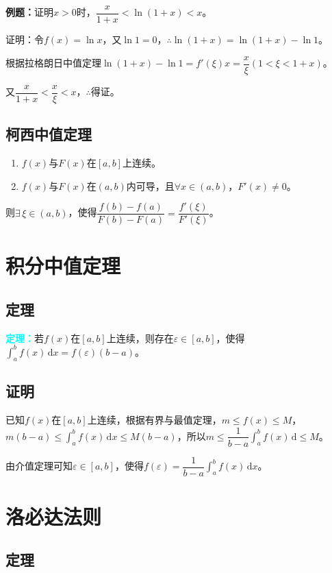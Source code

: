 \documentclass[UTF8, 12pt]{ctexart}
\begin{document}
\textbf{例题：}证明$x>0$时，$\dfrac{x}{1+x}<\ln(1+x)<x$。

证明：令$f(x)=\ln x$，又$\ln 1=0$，$\therefore\ln(1+x)=\ln(1+x)-\ln 1$。

根据拉格朗日中值定理$\ln(1+x)-\ln 1=f'(\xi)x=\dfrac{x}{\xi}(1<\xi<1+x)$。

又$\dfrac{x}{1+x}<\dfrac{x}{\xi}<x$，$\therefore$得证。

\subsection{柯西中值定理}

\begin{enumerate}
    \item $f(x)$与$F(x)$在$[a,b]$上连续。
    \item $f(x)$与$F(x)$在$(a,b)$内可导，且$\forall x\in(a,b)$，$F'(x)\neq 0$。
\end{enumerate}

则$\exists\,\xi\in(a,b)$，使得$\dfrac{f(b)-f(a)}{F(b)-F(a)}=\dfrac{f'(\xi)}{F'(\xi)}$。

\section{积分中值定理}

\subsection{定理}

\textcolor{aqua}{\textbf{定理：}}若$f(x)$在$[a,b]$上连续，则存在$\varepsilon\in[a,b]$，使得$\int_a^bf(x)\,\textrm{d}x=f(\varepsilon)(b-a)$。

\subsection{证明}

已知$f(x)$在$[a,b]$上连续，根据有界与最值定理，$m\leqslant f(x)\leqslant M$，$m(b-a)\leqslant\int_a^bf(x)\,\textrm{d}x\leqslant M(b-a)$，所以$m\leqslant\dfrac{1}{b-a}\int_a^bf(x)\,\textrm{d}\leqslant M$。

由介值定理可知$\varepsilon\in[a,b]$，使得$f(\varepsilon)=\dfrac{1}{b-a}\int_a^bf(x)\,\textrm{d}x$。

\section{洛必达法则}

\subsection{定理}
\end{document}

